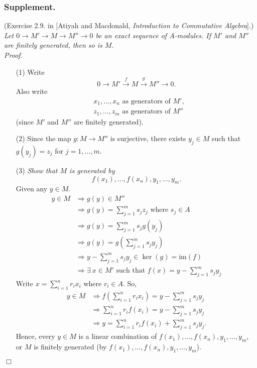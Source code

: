 \documentclass{article}
\begin{document}
\subsubsection*{Supplement.}
(Exercise 2.9. in [Atiyah and Macdonald, \emph{Introduction to Commutative Algebra}].)
\emph{Let $0 \to M' \to M \to M'' \to 0$ be an exact sequence of $A$-modules.
If $M'$ and $M''$ are finitely generated, then so is $M$.} \\



\emph{Proof.}
\begin{enumerate}
\item[(1)]
  Write
  \[
    0 \to M' \xrightarrow{f} M \xrightarrow{g} M'' \to 0.
  \]
  Also write
  \begin{align*}
    &x_1, \ldots, x_n \text{ as generators of } M', \\
    &z_1, \ldots, z_m \text{ as generators of } M''
  \end{align*}
  (since $M'$ and $M''$ are finitely generated).

\item[(2)]
  Since the map $g: M \to M''$ is surjective,
  there exists $y_j \in M$ such that $g(y_j) = z_j$ for $j = 1, \ldots, m$.

\item[(3)]
  \emph{Show that $M$ is generated by}
  \[
    f(x_1), \ldots, f(x_n), y_1, \ldots, y_m.
  \]
  Given any $y \in M$.
  \begin{align*}
    y \in M
    &\Longrightarrow g(y) \in M'' \\
    &\Longrightarrow g(y) = \sum_{j=1}^{m} s_j z_j \text{ where } s_j \in A \\
    &\Longrightarrow g(y) = \sum_{j=1}^{m} s_j g(y_j) \\
    &\Longrightarrow g(y) = g\left( \sum_{j=1}^{m} s_j y_j \right) \\
    &\Longrightarrow y - \sum_{j=1}^{m} s_j y_j \in \ker(g) = \text{im}(f) \\
    &\Longrightarrow \exists \: x \in M' \text{ such that } f(x) = y - \sum_{j=1}^{m} s_j y_j
  \end{align*}
  Write $x = \sum_{i=1}^{n} r_i x_i$ where $r_i \in A$.
  So,
  \begin{align*}
    y \in M
    &\Longrightarrow f\left( \sum_{i=1}^{n} r_i x_i \right) = y - \sum_{j=1}^{m} s_j y_j \\
    &\Longrightarrow \sum_{i=1}^{n} r_i f(x_i) = y - \sum_{j=1}^{m} s_j y_j \\
    &\Longrightarrow y = \sum_{i=1}^{n} r_i f(x_i) + \sum_{j=1}^{m} s_j y_j.
  \end{align*}
  Hence, every $y \in M$ is a linear combination of
  $f(x_1), \ldots, f(x_n), y_1, \ldots, y_m$,
  or $M$ is finitely generated
  (by $f(x_1), \ldots, f(x_n), y_1, \ldots, y_m$).
\end{enumerate}
$\Box$ \\\\
\end{document}
